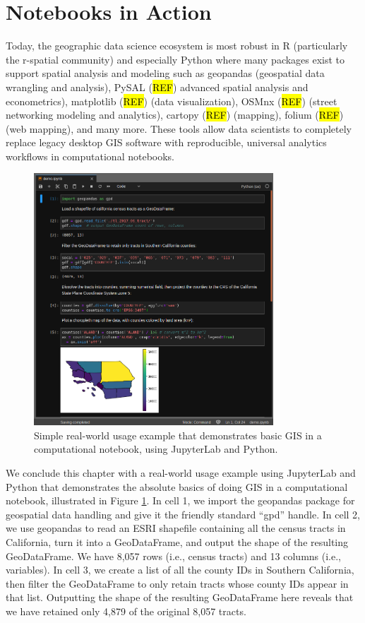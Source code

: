 \documentclass[11pt,letterpaper]{article}
\begin{document}
\section{Notebooks in Action}

Today, the geographic data science ecosystem is most robust in R (particularly the r-spatial community) and especially Python where many packages exist to support spatial analysis and modeling such as geopandas (geospatial data wrangling and analysis), PySAL (\hl{REF}) advanced spatial analysis and econometrics), matplotlib (\hl{REF}) (data visualization), OSMnx (\hl{REF}) (street networking modeling and analytics),  cartopy (\hl{REF}) (mapping), folium (\hl{REF}) (web mapping), and many more. These tools allow data scientists to completely replace legacy desktop GIS software with reproducible, universal analytics workflows in computational notebooks.

\begin{figure}[htb]
	\centering
	\includegraphics[width=0.8\textwidth]{code-demo.png}
	\caption{Simple real-world usage example that demonstrates basic GIS in a computational notebook, using JupyterLab and Python.}
	\label{fig:code_demo}
\end{figure}

We conclude this chapter with a real-world usage example using JupyterLab and Python that demonstrates the absolute basics of doing GIS in a computational notebook, illustrated in Figure \ref{fig:code_demo}. In cell 1, we import the geopandas package for geospatial data handling and give it the friendly standard \enquote{gpd} handle. In cell 2, we use geopandas to read an ESRI shapefile containing all the census tracts in California, turn it into a GeoDataFrame, and output the shape of the resulting GeoDataFrame. We have 8,057 rows (i.e., census tracts) and 13 columns (i.e., variables). In cell 3, we create a list of all the county IDs in Southern California, then filter the GeoDataFrame to only retain tracts whose county IDs appear in that list. Outputting the shape of the resulting GeoDataFrame here reveals that we have retained only 4,879 of the original 8,057 tracts.
\end{document}
